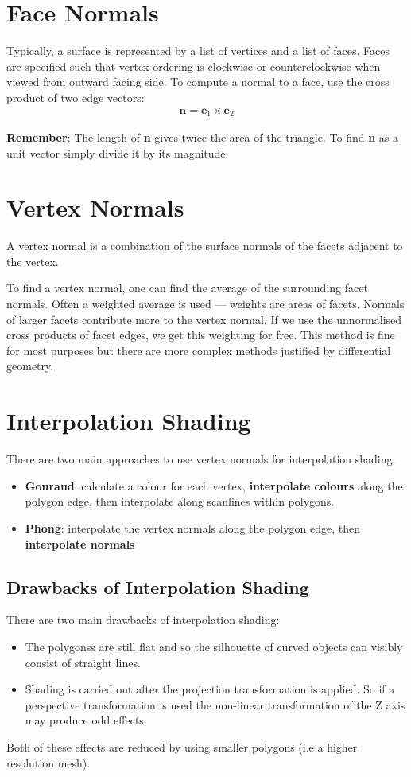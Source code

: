 \documentclass{article}
\begin{document}
\section{Face Normals}
Typically, a surface is represented by a list of vertices and a list of faces.
Faces are specified such that vertex ordering is clockwise or counterclockwise when viewed from outward facing side.
To compute a normal to a face, use the cross product of two edge vectors:
\begin{align*}
	\textbf{n} = \textbf{e}_1 \times \textbf{e}_2
\end{align*}

\textbf{Remember}: The length of \textbf{n} gives twice the area of the triangle.
To find \textbf{n} as a unit vector simply divide it by its magnitude.

\section{Vertex Normals}
A vertex normal is a combination of the surface normals of the facets adjacent to the vertex.

To find a vertex normal, one can find the average of the surrounding facet normals.
Often a weighted average is used --- weights are areas of facets.
Normals of larger facets contribute more to the vertex normal.
If we use the unnormalised cross products of facet edges, we get this weighting for free.
This method is fine for most purposes but there are more complex methods justified by differential geometry.

\section{Interpolation Shading}
There are two main approaches to use vertex normals for interpolation shading:
\begin{itemize}
	\item {\bf Gouraud}: calculate a colour for each vertex, {\bf interpolate colours} along the polygon edge, then interpolate along scanlines within polygons.
	\item \textbf{Phong}: interpolate the vertex normals along the polygon edge, then {\bf interpolate normals}
\end{itemize}

\subsection{Drawbacks of Interpolation Shading}
There are two main drawbacks of interpolation shading:
\begin{itemize}
	\item The polygonss are still flat and so the silhouette of curved objects can visibly consist of straight lines.
	\item Shading is carried out after the projection transformation is applied. So if a perspective transformation is used the non-linear transformation of the Z axis may produce odd effects.
\end{itemize}
Both of these effects are reduced by using smaller polygons (i.e a higher resolution mesh).
\end{document}
